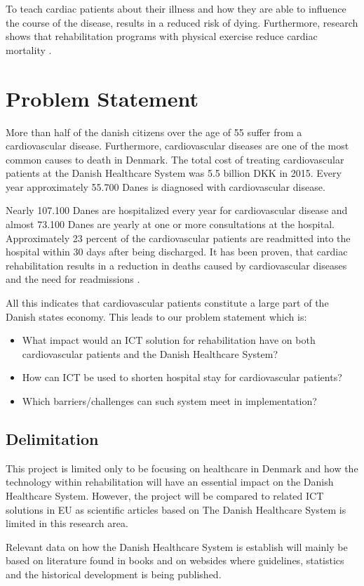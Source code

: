 To teach cardiac patients about their illness and how they are able to influence the course of the disease, results in a reduced risk of dying. Furthermore, research shows that rehabilitation programs with physical exercise reduce cardiac mortality \cite{Hjerteforening}.    
   


\section{Problem Statement}
More than half of the danish citizens over the age of 55 suffer from a cardiovascular disease. Furthermore, cardiovascular diseases are one of the most common causes to death in Denmark. The total cost of treating cardiovascular patients at the Danish Healthcare System was 5.5 billion DKK in 2015. Every year approximately 55.700 Danes is diagnosed with cardiovascular disease.   

Nearly 107.100 Danes are hospitalized every year for cardiovascular disease and almost 73.100 Danes are yearly at one or more consultations at the hospital. Approximately 23 percent of the cardiovascular patients are readmitted into the hospital within 30 days after being discharged. It has been proven, that cardiac rehabilitation results in a reduction in deaths caused by cardiovascular diseases and the need for readmissions \cite{Hjerteforening}.

All this indicates that cardiovascular patients constitute a large part of the Danish states economy. This leads to our problem statement which is:

\begin{itemize}
	\item What impact would an ICT solution for rehabilitation have on both cardiovascular patients and the Danish Healthcare System?
	\item How can ICT be used to shorten hospital stay for cardiovascular patients?
	\item Which barriers/challenges can such system meet in implementation?
\end{itemize}
\subsection{Delimitation}
This project is limited only to be focusing on healthcare in Denmark and how the technology within rehabilitation will have an essential impact on the Danish Healthcare System. However, the project will be compared to related ICT solutions in EU as scientific articles based on The Danish Healthcare System is limited in this research area. 

Relevant data on how the Danish Healthcare System is establish will mainly be based on literature found in books and on websides where guidelines, statistics and the historical development is being published. 


